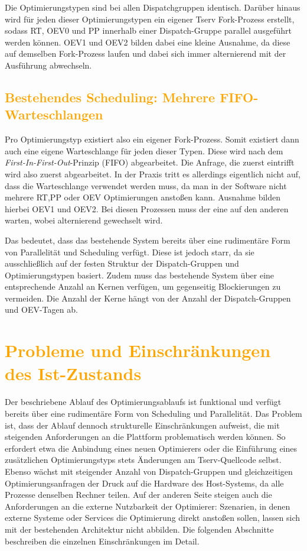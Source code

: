 \documentclass[
    12pt,               
    a4paper,            
    ngerman,            
    parskip=half,       
    headings=normal,   
    numbers=enddot,     
    toc=chapterentrywithdots 
]{scrreprt}\usepackage[utf8]{inputenc}
\begin{document}
Die Optimierungstypen sind bei allen Dispatchgruppen identisch. Darüber hinaus wird für jeden dieser Optimierungstypen ein eigener Tserv Fork-Prozess erstellt, sodass RT, OEV0 und PP innerhalb einer Dispatch-Gruppe parallel ausgeführt werden können. OEV1 und OEV2 bilden dabei eine kleine Ausnahme, da diese auf demselben Fork-Prozess laufen und dabei sich immer alternierend mit der Ausführung abwechseln. 

\subsection{\textcolor{orange}{Bestehendes Scheduling: Mehrere FIFO-Warteschlangen}}
Pro Optimierungstyp existiert also ein eigener Fork-Prozess. Somit existiert dann auch eine eigene Warteschlange für jeden dieser Typen. Diese wird nach dem \textit{First-In-First-Out}-Prinzip (FIFO) abgearbeitet. Die Anfrage, die zuerst eintrifft wird also zuerst abgearbeitet. In der Praxis tritt es allerdings eigentlich nicht auf, dass die Warteschlange verwendet werden muss, da man in der Software nicht mehrere RT,PP oder OEV Optimierungen anstoßen kann. Ausnahme bilden hierbei OEV1 und OEV2. Bei diesen Prozessen muss der eine auf den anderen warten, wobei alternierend gewechselt wird. 

Das bedeutet, dass das bestehende System bereits über eine rudimentäre Form von Parallelität und Scheduling verfügt. Diese ist jedoch starr, da sie ausschließlich auf der festen Struktur der Dispatch-Gruppen und Optimierungstypen basiert. Zudem muss das bestehende System über eine entsprechende Anzahl an Kernen verfügen, um gegenseitig Blockierungen zu vermeiden. Die Anzahl der Kerne hängt von der Anzahl der Dispatch-Gruppen und OEV-Tagen ab.

\section{\textcolor{orange}{Probleme und Einschränkungen des Ist-Zustands}}
Der beschriebene Ablauf des Optimierungsablaufs ist funktional und verfügt bereits über eine rudimentäre Form von Scheduling und Parallelität. Das Problem ist, dass der Ablauf dennoch strukturelle Einschränkungen aufweist, die mit steigenden Anforderungen an die Plattform problematisch werden können. So erfordert etwa die Anbindung eines neuen Optimierers oder die Einführung eines zusätzlichen Optimierungstyps stets Änderungen am Tserv-Quellcode selbst. Ebenso wächst mit steigender Anzahl von Dispatch-Gruppen und gleichzeitigen Optimierungsanfragen der Druck auf die Hardware des Host-Systems, da alle Prozesse denselben Rechner teilen. Auf der anderen Seite steigen auch die Anforderungen an die externe Nutzbarkeit der Optimierer: Szenarien, in denen externe Systeme oder Services die Optimierung direkt anstoßen sollen, lassen sich mit der bestehenden Architektur nicht abbilden. Die folgenden Abschnitte beschreiben die einzelnen Einschränkungen im Detail.
\end{document}
